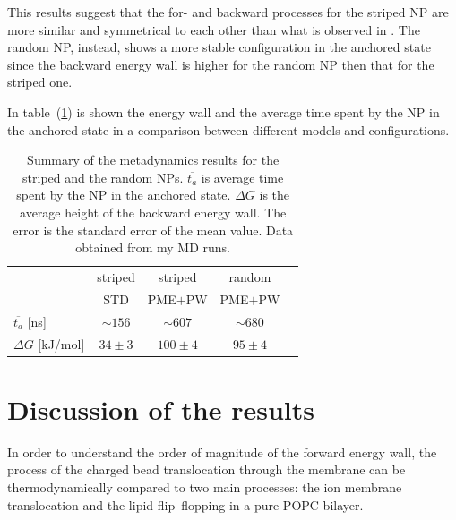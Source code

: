 This results suggest that the for- and backward processes for the striped \ac{NP} are more similar and symmetrical to each other than what is observed in \cite{ourPaper}. The random \ac{NP}, instead, shows a more stable configuration in the anchored state since the backward energy wall is higher for the random \ac{NP} then that for the striped one.

In table~(\ref{tab:anchorTime}) is shown the energy wall and the average time spent by the \ac{NP} in the anchored state in a comparison between different models and configurations.
\begin{table}[h!t]
	\centering
	\begin{tabular}{lcccc}
		\toprule
		\,					& striped		& striped		& random	\\
		\,					& STD & \acs{PME}$+$\acs{PW} & \acs{PME}$+$\acs{PW} \\ \toprule
	$\overline{t_{a}}$ [ns]	& $\sim 156$	& $\sim 607$	& $\sim 680$	\\ \midrule
	$\Delta G$ [kJ/mol] 	& $34 \pm 3$ 	& $100 \pm 4$ 	& $95 \pm 4$	\\ \bottomrule
	\end{tabular}
	\caption{Summary of the metadynamics results for the striped and the random \acp{NP}. $\overline{t_a}$ is average time spent by the \acs{NP} in the anchored state. $\Delta G$ is the average height of the backward energy wall. The error is the standard error of the mean value. Data obtained from my \acs{MD} runs.}
	\label{tab:anchorTime}
\end{table}

\section{Discussion of the results}
In order to understand the order of magnitude of the forward energy wall, the process of the charged bead translocation through the membrane can be thermodynamically compared to two main processes: the ion membrane translocation and the lipid flip--flopping in a pure \ac{POPC} bilayer.

